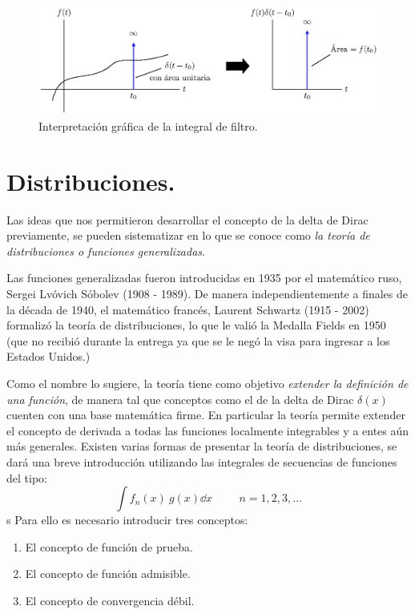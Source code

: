 \begin{figure}[H]
    \centering
    \includegraphics[scale=1]{Imagenes/plot_propiedad_desplazamiento.eps}
    \caption{Interpretación gráfica de la integral de filtro.}
    \label{fig:figura_05_10}
\end{figure}

\section{Distribuciones.}

Las ideas que nos permitieron desarrollar el concepto de la delta de Dirac previamente, se pueden sistematizar en lo que se conoce como \emph{la teoría de distribuciones o funciones generalizadas}.
\par
Las funciones generalizadas fueron introducidas en 1935 por el matemático ruso, Sergei Lvóvich Sóbolev (1908 - 1989). De manera independientemente a finales de la década de 1940, el matemático francés, Laurent Schwartz (1915 - 2002) formalizó la teoría de distribuciones, lo que le valió la Medalla Fields en 1950 (que no recibió durante la entrega ya que se le negó la visa para ingresar a los Estados Unidos.)
\par
Como el nombre lo sugiere, la teoría tiene como objetivo  \emph{extender la definición de una función}, de manera tal que conceptos como el de la delta de Dirac $\delta (x)$ cuenten con una base matemática firme. En particular la teoría permite extender el concepto de derivada a todas las funciones localmente integrables y a entes aún más generales. Existen varias formas de presentar la teoría de distribuciones, se dará una breve introducción utilizando las integrales de secuencias de funciones del tipo:
\begin{equation}
\int f_{n}(x) \: g(x) \dd{x} \hspace{1cm} n = 1, 2, 3 , \ldots
\label{eq:ecuacion_1_99}
\end{equation}s
Para ello es necesario introducir tres conceptos:
\begin{enumerate}
\item El concepto de función de prueba.
\item El concepto de función admisible.
\item El concepto de convergencia débil.
\end{enumerate}

